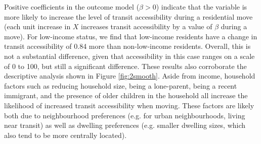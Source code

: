 Positive coefficients in the outcome model ($\beta > 0$) indicate that the variable is more likely to increase the level of transit accessibility during a residential move (each unit increase in $X$ increases transit accessibility by a value of $\beta$ during a move). For low-income status, we find that low-income residents have a change in transit accessibility of 0.84 more than non-low-income residents. Overall, this is not a substantial difference, given that accessibility in this case ranges on a scale of 0 to 100, but still a significant difference. These results also corroborate the descriptive analysis shown in Figure \ref{fig:2smooth}. Aside from income, household factors such as reducing household size, being a lone-parent, being a recent immigrant, and the presence of older children in the household all increase the likelihood of increased transit accessibility when moving. These factors are likely both due to neighbourhood preferences (e.g. for urban neighbourhoods, living near transit) as well as dwelling preferences (e.g. smaller dwelling sizes, which also tend to be more centrally located).



